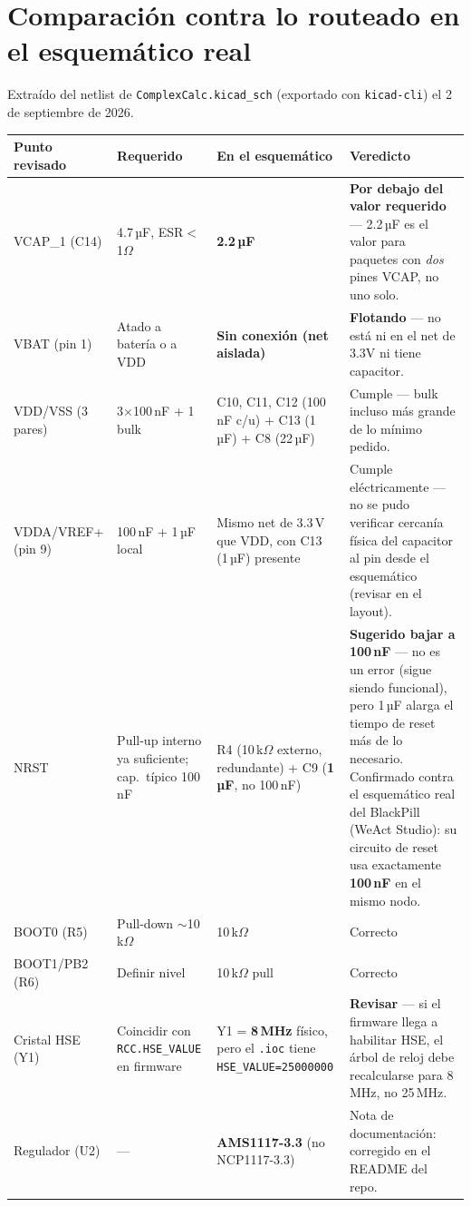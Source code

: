 \documentclass[11pt]{article}
\begin{document}
\clearpage
\section{Comparación contra lo routeado en el esquemático real}

Extraído del netlist de \texttt{ComplexCalc.kicad\_sch} (exportado con
\texttt{kicad-cli}) el 2 de septiembre de 2026.

\begin{longtable}{p{3.5cm}p{3.2cm}p{3.2cm}p{4cm}}
\toprule
\textbf{Punto revisado} & \textbf{Requerido} & \textbf{En el esquemático} & \textbf{Veredicto} \\
\midrule
\endhead
VCAP\_1 (C14) & 4.7\,µF, ESR$<$1$\Omega$ & \textbf{2.2\,µF} &
  \textcolor{warnred}{\textbf{Por debajo del valor requerido}} — 2.2\,µF es el
  valor para paquetes con \emph{dos} pines VCAP, no uno solo. \\
VBAT (pin 1) & Atado a batería o a VDD & \textbf{Sin conexión (net aislada)} &
  \textcolor{warnred}{\textbf{Flotando}} — no está ni en el net de 3.3V ni tiene
  capacitor. \\
VDD/VSS (3 pares) & 3$\times$100\,nF + 1 bulk & C10, C11, C12 (100\,nF c/u)
  + C13 (1\,µF) + C8 (22\,µF) & \textcolor{okgreen}{Cumple} — bulk incluso más
  grande de lo mínimo pedido. \\
VDDA/VREF+ (pin 9) & 100\,nF + 1\,µF local & Mismo net de 3.3\,V que VDD,
  con C13 (1\,µF) presente & \textcolor{okgreen}{Cumple eléctricamente} — no se
  pudo verificar cercanía física del capacitor al pin desde el esquemático
  (revisar en el layout). \\
NRST & Pull-up interno ya suficiente; cap.\ típico 100\,nF & R4 (10\,k$\Omega$
  externo, redundante) + C9 (\textbf{1\,µF}, no 100\,nF) &
  \textcolor{sugamber}{\textbf{Sugerido bajar a 100\,nF}} — no es un error
  (sigue siendo funcional), pero 1\,µF alarga el tiempo de reset más de lo
  necesario. Confirmado contra el esquemático real del BlackPill (WeAct
  Studio): su circuito de reset usa exactamente \textbf{100\,nF} en el mismo
  nodo. \\
BOOT0 (R5) & Pull-down $\sim$10\,k$\Omega$ & 10\,k$\Omega$ &
  \textcolor{okgreen}{Correcto} \\
BOOT1/PB2 (R6) & Definir nivel & 10\,k$\Omega$ pull &
  \textcolor{okgreen}{Correcto} \\
Cristal HSE (Y1) & Coincidir con \texttt{RCC.HSE\_VALUE} en firmware &
  Y1 = \textbf{8\,MHz} físico, pero el \texttt{.ioc} tiene
  \texttt{HSE\_VALUE=25000000} & \textcolor{warnred}{\textbf{Revisar}} — si el
  firmware llega a habilitar HSE, el árbol de reloj debe recalcularse para
  8\,MHz, no 25\,MHz. \\
Regulador (U2) & --- & \textbf{AMS1117-3.3} (no NCP1117-3.3) &
  Nota de documentación: corregido en el README del repo. \\
\bottomrule
\end{longtable}
\end{document}
